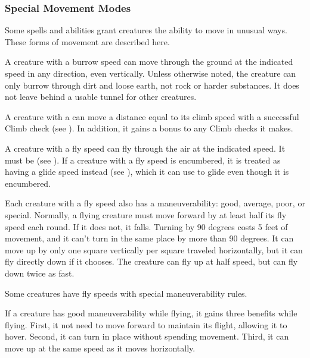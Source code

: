         \subsubsection{Special Movement Modes}\label{Special Movement Modes}
            Some spells and abilities grant creatures the ability to move in unusual ways. These forms of movement are described here.

            A creature with a burrow speed can move through the ground at the indicated speed in any direction, even vertically. Unless otherwise noted, the creature can only burrow through dirt and loose earth, not rock or harder substances. It does not leave behind a usable tunnel for other creatures.

            A creature with a  can move a distance equal to its climb speed with a successful Climb check (see ).
            In addition, it gains a  bonus to any Climb checks it makes.

            \label{Flying}
            A creature with a fly speed can fly through the air at the indicated speed. It must be  (see ). If a creature with a fly speed is encumbered, it is treated as having a glide speed instead (see ), which it can use to glide even though it is encumbered.

            Each creature with a fly speed also has a maneuverability: good, average, poor, or special. Normally, a flying creature must move forward by at least half its fly speed each round. If it does not, it falls. Turning by 90 degrees costs 5 feet of movement, and it can't turn in the same place by more than 90 degrees. It can move up by only one square vertically per square traveled horizontally, but it can fly directly down if it chooses. The creature can fly up at half speed, but can fly down twice as fast.

            \label{Maneuverability} Some creatures have fly speeds with special maneuverability rules.

             If a creature has good maneuverability while flying, it gains three benefits while flying.
            First, it not need to move forward to maintain its flight, allowing it to hover.
            Second, it can turn in place without spending movement.
            Third, it can move up at the same speed as it moves horizontally.


